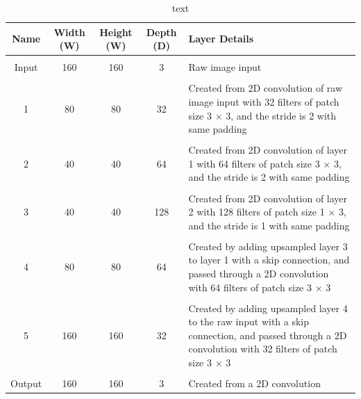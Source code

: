 \documentclass[a4paper]{article}
\begin{document}
\begin{table}[h]
\centering
\caption{text}\scriptsize
\begin{tabular}{ccccp{8cm}}
\toprule
\textbf{Name} & \textbf{Width (W)} & \textbf{Height (W)} & \textbf{Depth (D)} & Layer Details\\  
\midrule
 & & & &\\
Input & 160 & 160 & 3 & Raw image input\\
 & & & &\\
1 & 80 & 80 & 32 & Created from 2D convolution of raw image input with 32 filters of patch size 3 $\times $ 3, and the stride is 2 with same padding\\
 & & & &\\
2 & 40 & 40 & 64 & Created from 2D convolution of layer 1 with 64 filters of patch size 3 $\times $ 3, and the stride is 2 with same padding\\
 & & & &\\
3 & 40 & 40 & 128 & Created from 2D convolution of layer 2 with 128 filters of patch size 1 $\times$ 3, and the stride is 1 with same padding\\
 & & & &\\
4 & 80 & 80 & 64 & Created by adding upsampled layer 3 to layer 1 with a skip connection, and passed through a 2D convolution with 64 filters of patch size 3 $\times$ 3\\
 & & & &\\
5 & 160 & 160 & 32 & Created by adding upsampled layer 4 to the raw input with a skip connection, and passed through a 2D convolution with 32 filters of patch size 3 $\times$ 3\\
 & & & &\\
Output & 160 & 160 & 3 & Created from a 2D convolution\\
\bottomrule
\end{tabular}
\end{table}

\newpage
\end{document}
